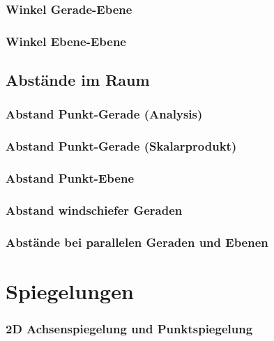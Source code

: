\subsubsection{Winkel Gerade-Ebene}
\subsubsection{Winkel Ebene-Ebene}

\subsection{Abstände im Raum}
\subsubsection{Abstand Punkt-Gerade (Analysis)}
\subsubsection{Abstand Punkt-Gerade (Skalarprodukt)}
\subsubsection{Abstand Punkt-Ebene}
\subsubsection{Abstand windschiefer Geraden}
\subsubsection{Abstände bei parallelen Geraden und Ebenen}

\section{Spiegelungen}
\subsubsection{2D Achsenspiegelung und Punktspiegelung}

